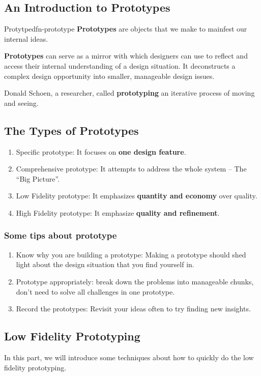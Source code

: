 \documentclass[math,code]{amznotes}
\theoremstyle{remark}
\begin{document}
\subsection{An Introduction to Prototypes}
\begin{dfnbox}{Protytpe}{dfn-prototype}
    {\color{red} \textbf{Prototypes}} are objects that we make to mainfest our internal ideas.
\end{dfnbox}
\textbf{Prototypes} can serve as a mirror with which designers can use to reflect and access their internal understanding of a design situation. It deconstructs a complex design opportunity into smaller, manageable design issues. 

Donald Schoen, a researcher, called \textbf{prototyping} an iterative process of moving and seeing.
\subsection{The Types of Prototypes}
\begin{enumerate}
    \item Specific prototype: It focuses on \textbf{one design feature}.
    \item Comprehensive prototype: It attempts to address the whole system -- The ``Big Picture''.
    \item Low Fidelity prototype: It emphasizes \textbf{quantity and economy} over quality.
    \item High Fidelity prototype: It emphasize \textbf{quality and refinement}.
\end{enumerate}
\subsubsection{Some tips about prototype}
\begin{enumerate}
    \item Know why you are building a prototype: Making a prototype should shed light about the design situation that you find yourself in.
    \item Prototype appropriately: break down the problems into manageable chunks, don't need to solve all challenges in one prototype.
    \item Record the prototypes: Revisit your ideas often to try finding new insights.
\end{enumerate}

\subsection{Low Fidelity Prototyping}
In this part, we will introduce some techniques about how to quickly do the low fidelity prototyping.
\end{document}
